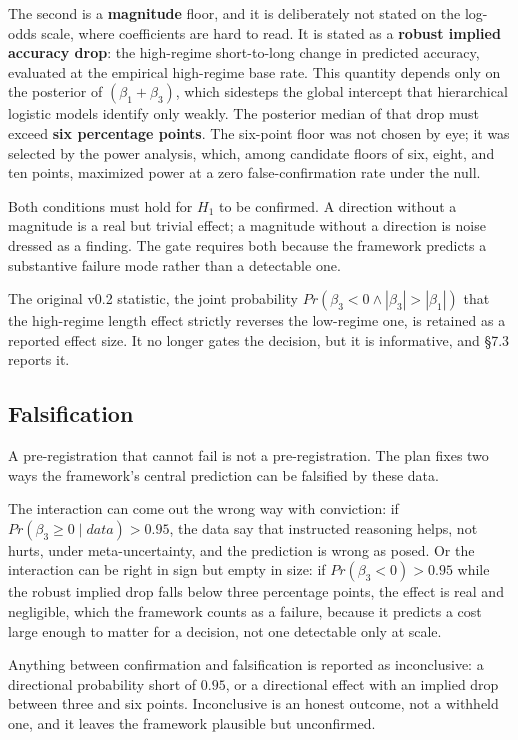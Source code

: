 \documentclass{article}
\begin{document}
The second is a \textbf{magnitude} floor, and it is deliberately not
stated on the log-odds scale, where coefficients are hard to read. It is
stated as a \textbf{robust implied accuracy drop}: the high-regime
short-to-long change in predicted accuracy, evaluated at the empirical
high-regime base rate. This quantity depends only on the posterior of
\((\beta_{1} + \beta_{3})\), which sidesteps the global intercept that
hierarchical logistic models identify only weakly. The posterior median
of that drop must exceed \textbf{six percentage points}. The six-point
floor was not chosen by eye; it was selected by the power analysis,
which, among candidate floors of six, eight, and ten points, maximized
power at a zero false-confirmation rate under the null.

Both conditions must hold for \(H_{1}\) to be confirmed. A direction
without a magnitude is a real but trivial effect; a magnitude without a
direction is noise dressed as a finding. The gate requires both because
the framework predicts a substantive failure mode rather than a
detectable one.

The original v0.2 statistic, the joint probability
\(Pr(\beta_{3} < 0 \land |\beta_{3}| > |\beta_{1}|)\) that the
high-regime length effect strictly reverses the low-regime one, is
retained as a reported effect size. It no longer gates the decision, but
it is informative, and \S{}7.3 reports it.

\subsection{Falsification}\label{falsification}

A pre-registration that cannot fail is not a pre-registration. The plan
fixes two ways the framework's central prediction can be falsified by
these data.

The interaction can come out the wrong way with conviction: if
\(Pr(\beta_{3} \geq 0 \mid data) > 0.95\), the data say that instructed
reasoning helps, not hurts, under meta-uncertainty, and the prediction
is wrong as posed. Or the interaction can be right in sign but empty in
size: if \(Pr(\beta_{3} < 0) > 0.95\) while the robust implied drop
falls below three percentage points, the effect is real and negligible,
which the framework counts as a failure, because it predicts a cost
large enough to matter for a decision, not one detectable only at scale.

Anything between confirmation and falsification is reported as
inconclusive: a directional probability short of \(0.95\), or a
directional effect with an implied drop between three and six points.
Inconclusive is an honest outcome, not a withheld one, and it leaves the
framework plausible but unconfirmed.
\end{document}
